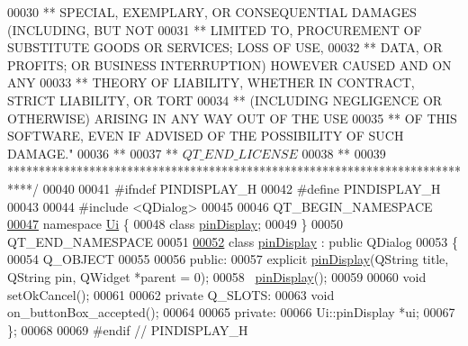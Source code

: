 \begin{DoxyCode}
00030 \textcolor{comment}{** SPECIAL, EXEMPLARY, OR CONSEQUENTIAL DAMAGES (INCLUDING, BUT NOT}
00031 \textcolor{comment}{** LIMITED TO, PROCUREMENT OF SUBSTITUTE GOODS OR SERVICES; LOSS OF USE,}
00032 \textcolor{comment}{** DATA, OR PROFITS; OR BUSINESS INTERRUPTION) HOWEVER CAUSED AND ON ANY}
00033 \textcolor{comment}{** THEORY OF LIABILITY, WHETHER IN CONTRACT, STRICT LIABILITY, OR TORT}
00034 \textcolor{comment}{** (INCLUDING NEGLIGENCE OR OTHERWISE) ARISING IN ANY WAY OUT OF THE USE}
00035 \textcolor{comment}{** OF THIS SOFTWARE, EVEN IF ADVISED OF THE POSSIBILITY OF SUCH DAMAGE."}
00036 \textcolor{comment}{**}
00037 \textcolor{comment}{** $QT\_END\_LICENSE$}
00038 \textcolor{comment}{**}
00039 \textcolor{comment}{****************************************************************************/}
00040 
00041 \textcolor{preprocessor}{#ifndef PINDISPLAY\_H}
00042 \textcolor{preprocessor}{#define PINDISPLAY\_H}
00043 
00044 \textcolor{preprocessor}{#include <QDialog>}
00045 
00046 QT\_BEGIN\_NAMESPACE
\hypertarget{pindisplay_8h_source.tex_l00047}{}\hyperlink{namespaceUi}{00047} \textcolor{keyword}{namespace }\hyperlink{namespaceUi}{Ui} \{
00048     \textcolor{keyword}{class }\hyperlink{classpinDisplay}{pinDisplay};
00049 \}
00050 QT\_END\_NAMESPACE
00051 
\hypertarget{pindisplay_8h_source.tex_l00052}{}\hyperlink{classpinDisplay}{00052} \textcolor{keyword}{class }\hyperlink{classpinDisplay}{pinDisplay} : \textcolor{keyword}{public} QDialog
00053 \{
00054     Q\_OBJECT
00055 
00056 \textcolor{keyword}{public}:
00057     \textcolor{keyword}{explicit} \hyperlink{classpinDisplay}{pinDisplay}(QString title, QString pin, QWidget *parent = 0);
00058     ~\hyperlink{classpinDisplay}{pinDisplay}();
00059 
00060     \textcolor{keywordtype}{void} setOkCancel();
00061 
00062 \textcolor{keyword}{private} Q\_SLOTS:
00063     \textcolor{keywordtype}{void} on\_buttonBox\_accepted();
00064 
00065 \textcolor{keyword}{private}:
00066     Ui::pinDisplay *ui;
00067 \};
00068 
00069 \textcolor{preprocessor}{#endif // PINDISPLAY\_H}
\end{DoxyCode}
